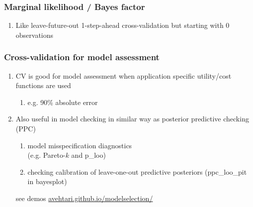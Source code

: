 \documentclass[10pt]{beamer}
\begin{document}
\begin{frame}{}

\frametitle{ Marginal likelihood / Bayes factor}

\vspace{-0.3\baselineskip}
\begin{enumerate}
\item Like leave-future-out 1-step-ahead cross-validation but starting with 0 observations\\
\end{enumerate}
\vspace{-0.5\baselineskip}

\end{frame}

\begin{frame}{}

\frametitle{ Cross-validation for model assessment}

\begin{enumerate}
\item CV is good for model assessment when application specific utility/cost functions are used
  \begin{enumerate}
  \item e.g. 90\% absolute error
  \end{enumerate}
\item<2-> Also useful in model checking in similar way as posterior
  predictive checking (PPC)
  \begin{enumerate}
  \item model misspecification diagnostics\\ (e.g. Pareto-$k$ and p\_loo)
  \item checking calibration of leave-one-out predictive posteriors
    (ppc\_loo\_pit in bayesplot)
  \end{enumerate}
  {\small see demos \url{avehtari.github.io/modelselection/}}
\end{enumerate}

\end{frame}
\end{document}
